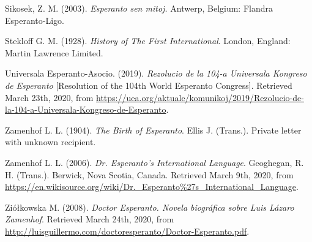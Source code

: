 Sikosek, Z. M. (2003). \textit{Esperanto sen mitoj.} Antwerp, Belgium: Flandra Esperanto-Ligo. 

Stekloff G. M. (1928). \textit{History of The First International}. London, England: Martin Lawrence Limited.

Universala Esperanto-Asocio. (2019). \textit{Rezolucio de la 104-a Universala Kongreso de Esperanto} [Resolution of the 104th World Esperanto Congress]. Retrieved March 23th, 2020, from \url{https://uea.org/aktuale/komunikoj/2019/Rezolucio-de-la-104-a-Universala-Kongreso-de-Esperanto}.

Zamenhof L. L. (1904). \textit{The Birth of Esperanto}. Ellis J. (Trans.). Private letter with unknown recipient.

Zamenhof L. L. (2006). \textit{Dr. Esperanto's International Language}. Geoghegan, R. H. (Trans.). Berwick, Nova Scotia, Canada. Retrieved March 9th, 2020, from \url{https://en.wikisource.org/wiki/Dr._Esperanto\%27s_International_Language}.

Ziółkowska M. (2008). \textit{Doctor Esperanto. Novela biográfica sobre Luis Lázaro Zamenhof}. Retrieved March 24th, 2020, from \url{http://luisguillermo.com/doctoresperanto/Doctor-Esperanto.pdf}.
